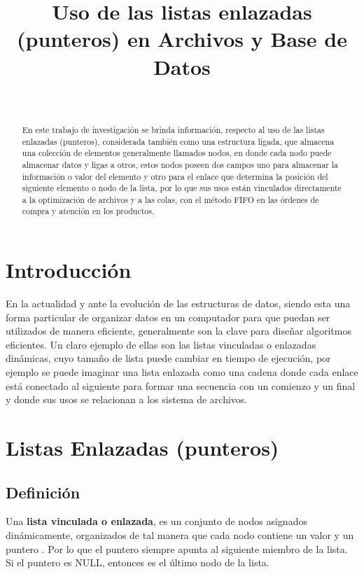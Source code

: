 \documentclass[10pt,journal]{IEEEtran}
\title{Uso de las listas enlazadas (punteros) en Archivos y Base de Datos}
\author{
\IEEEauthorblockN{{\Large Angely Mendez Cruz}} \\
\vspace{2mm}
\IEEEauthorblockA{\textit{Organización de Archivos} \\
\textit{Escuela de Informática} \\
\textit{Facultad de Ciencias Físicas y Matemáticas} \\
\textit{Universidad Nacional de Trujillo, \\ Perú }
\\ \vspace{1mm}
t052701020@unitru.edu.pe}}
\begin{document}
\maketitle

    \begin{abstract}
    En este trabajo de investigación se brinda información, respecto al uso de las listas enlazadas (punteros), considerada también como una estructura ligada, que almacena una colección de elementos generalmente llamados nodos, en donde cada nodo puede almacenar datos y ligas a otros, estos nodos poseen dos campos uno para almacenar la información o valor del elemento y otro para el enlace que determina la posición del siguiente elemento o nodo de la lista, por lo que sus usos están vinculados directamente a la optimización de archivos y a las colas, con el método FIFO en las órdenes de compra y atención en los productos.
    \end{abstract}
    
    \section{\textbf{Introducción}}
    
    En la actualidad y ante la evolución de las estructuras de datos, siendo esta una forma particular de organizar datos en un computador para que puedan ser utilizados de manera eficiente, generalmente son la clave para diseñar algoritmos eficientes. Un claro ejemplo de ellas son las listas vinculadas o enlazadas dinámicas, cuyo tamaño de lista puede cambiar en tiempo de ejecución, por ejemplo se puede imaginar una lista enlazada como una cadena donde cada enlace está conectado al siguiente para formar una secuencia con un comienzo y un final y donde sus usos se relacionan a los sistema de  archivos.
    
    \section{\textbf{Listas Enlazadas (punteros)}}
    \subsection{\textbf{Definición}}
    Una \textbf{lista vinculada o enlazada}, es un conjunto de nodos asignados dinámicamente, organizados de tal manera que cada nodo contiene un valor y 
    un puntero \cite{Listasvi9:online}. Por lo que el puntero siempre apunta al siguiente miembro de la lista. Si el puntero es NULL, entonces es el último nodo de la lista.
\end{document}
